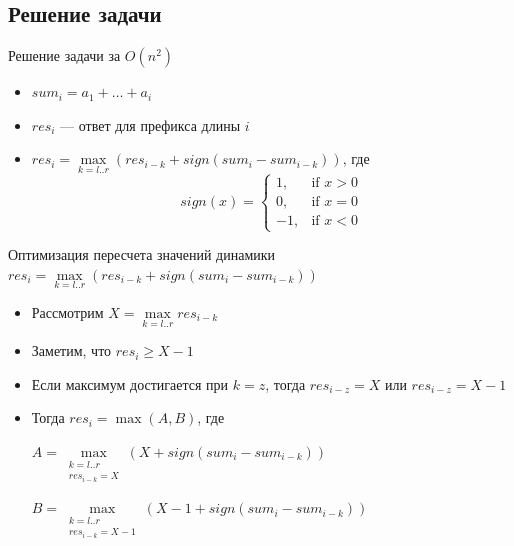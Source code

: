 \subsection{Решение задачи}

\begin{frame}[t]{Решение задачи за $O(n^2)$}
\begin{itemize}
  \item $sum_i = a_1 + \ldots + a_i$
  \item $res_i$ --- ответ для префикса длины $i$
  \item $res_i = \max\limits_{k=l..r} \left(res_{i - k} + sign(sum_i - sum_{i - k})\right)$,
  где \[
      sign(x)= 
      \begin{cases}
         1, & \text{if } x > 0\\
         0, & \text{if } x = 0\\
        -1, & \text{if } x < 0
      \end{cases}
      \]
\end{itemize}
\end{frame}

\begin{frame}[t]{Оптимизация пересчета значений динамики}
$res_i = \max\limits_{k=l..r} \left(res_{i - k} + sign(sum_i - sum_{i - k})\right)$
\begin{itemize}
  \item Рассмотрим $X = \max\limits_{k=l..r} res_{i-k}$
  \item Заметим, что $res_i \geqslant X - 1$
  \item Если максимум достигается при $k=z$, тогда $res_{i-z} = X$ или $res_{i-z} = X - 1$
  \item Тогда $res_i = \max(A, B)$, где

        $A = \max\limits_{\substack{k=l..r\\
                                    res_{i-k}=X}} \left(X + sign(sum_i - sum_{i-k})\right)$
        
        $B = \max\limits_{\substack{k=l..r\\
                                    res_{i-k}=X-1}} \left(X-1 + sign(sum_i - sum_{i-k})\right)$
\end{itemize}
\end{frame}

